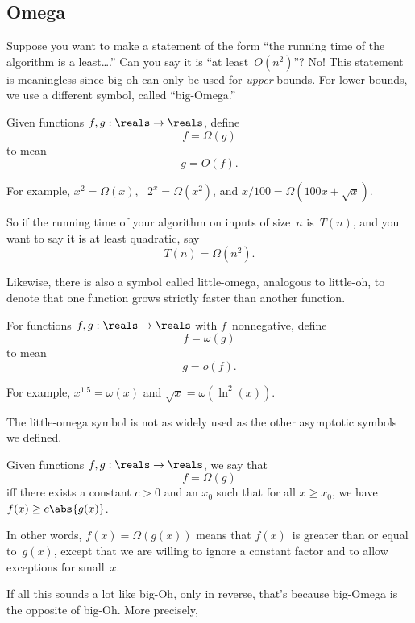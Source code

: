 \subsection{Omega}\label{omega_subsec}

Suppose you want to make a statement of the form ``the running time of
the algorithm is a least\dots.''  Can you say it is ``at
least~$O(n^2)$''?  No!  This statement is meaningless since big-oh can
only be used for \emph{upper} bounds.  For lower bounds, we use a
different symbol, called ``big-Omega.''
\begin{definition}\label{def:Omega}
Given functions $f, g : \reals \to \reals$, define
\[
    f = \Omega(g)
\]
to mean
\[
g = O(f).
\]
\end{definition}
For example, $x^2 = \Omega(x)$, \ $2^x = \Omega(x^2)$, and $x/100 =
\Omega(100 x + \sqrt{x})$.

So if the running time of your algorithm on inputs of size~$n$
is~$T(n)$, and you want to say it is at least quadratic, say
\[
    T(n) = \Omega(n^2).
\]

Likewise, there is also a symbol called little-omega, analogous to
little-oh, to denote that one function grows strictly faster than
another function.

\begin{definition}\label{def:omega}
For functions $f, g: \reals \to \reals$ with $f$~nonnegative, define
\[
    f = \omega(g)
\]
to mean
\[
g = o(f).
\]
\end{definition}

For example, $x^{1.5} = \omega(x)$ and $\sqrt{x} = \omega(\ln^2(x))$.

The little-omega symbol is not as widely used as the other asymptotic
symbols we defined.


\iffalse

\begin{definition}\label{def:Omega}
Given functions $f, g : \reals \to \reals$, we say that
\[
    f = \Omega(g)
\]
iff there exists a constant $c > 0$ and an $x_0$ such that for all $x
\ge x_0$, we have $f(x) \ge c \abs{g(x)}$.
\end{definition}

In other words, $f(x) = \Omega(g(x))$ means that $f(x)$~is greater
than or equal to~$g(x)$, except that we are willing to ignore a
constant factor and to allow exceptions for small~$x$.

If all this sounds a lot like big-Oh, only in reverse, that's because
big-Omega is the opposite of big-Oh.  More precisely,

